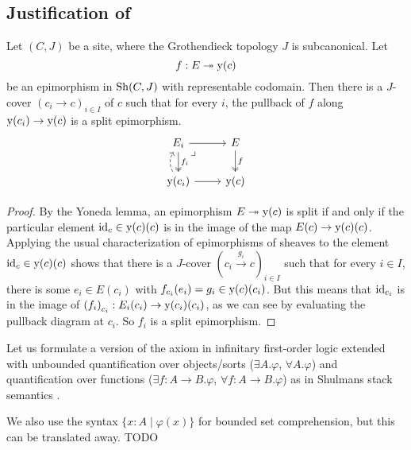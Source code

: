 \subsection{Justification of }

\begin{lemma}
  Let $(C, J)$ be a site,
  where the Grothendieck topology $J$ is subcanonical.
  Let
  \[ f : E \twoheadrightarrow \mathrm{y}(c) \]
  be an epimorphism in $\mathrm{Sh}(C, J)$ with representable codomain.
  Then there is a $J$-cover $(c_i \to c)_{i \in I}$ of $c$
  such that for every $i$,
  the pullback of $f$ along $\mathrm{y}(c_i) \to \mathrm{y}(c)$
  is a split epimorphism.
  \[ \begin{tikzcd}
    E_i \ar[r] \ar[d, two heads, "f_i"] \ar[dr, phantom, very near start, "\lrcorner"] &
    E \ar[d, two heads, "f"] \\
    \yo(c_i) \ar[r] \ar[u, bend left, dashed]&
    \yo(c)
  \end{tikzcd} \]
\end{lemma}

\begin{proof}
  By the Yoneda lemma,
  an epimorphism $E \twoheadrightarrow \mathrm{y}(c)$ is split
  if and only if
  the particular element $\mathrm{id}_c \in \mathrm{y}(c)(c)$
  is in the image of the map $E(c) \to \mathrm{y}(c)(c)$.
  Applying the usual characterization of epimorphisms of sheaves
  \cite[Corollary III.7.5]{maclane-moerdjik}
  to the element $\mathrm{id}_c \in \mathrm{y}(c)(c)$
  shows that there is a $J$-cover ${(c_i \xrightarrow{g_i} c)}_{i \in I}$
  such that for every $i \in I$,
  there is some $e_i \in E(c_i)$
  with $f_{c_i}(e_i) = g_i \in \mathrm{y}(c)(c_i)$.
  But this means that $\mathrm{id}_{c_i}$ is in the image of ${(f_i)}_{c_i} : E_i(c_i) \to \mathrm{y}(c_i)(c_i)$,
  as we can see by evaluating the pullback diagram at $c_i$.
  So $f_i$ is a split epimorphism.
\end{proof}

Let us formulate a version of the axiom 
in infinitary first-order logic extended with
unbounded quantification over objects/sorts
($\exists A. \varphi$, $\forall A. \varphi$)
and quantification over functions
($\exists f : A \to B. \varphi$, $\forall f : A \to B. \varphi$)
as in Shulmans stack semantics \cite[Section 7]{shulman-stack-semantics}.

We also use the syntax $\{x : A \mid \varphi(x)\}$
for bounded set comprehension,
but this can be translated away.
TODO
